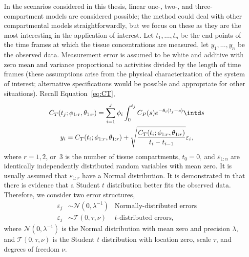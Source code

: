 In the scenarios considered in this thesis, linear one-, two-, and
three-compartment models are considered possible; the method could deal with
other compartmental models straightforwardly, but we focus on these as they
are the most interesting in the application of interest. Let $t_1, \dots, t_n$
be the end points of the time frames at which the tissue concentrations are
measured, let $y_1,\dots,y_n$ be the observed data. Measurement error is
assumed to be white and additive with zero mean and variance proportional to
activities divided by the length of time frames (these assumptions arise from
the physical characterization of the \pet system of interest; alternative
specifications would be possible and appropriate for other situations).
Recall Equation~\eqref{eq:CT},
\begin{gather*}
  C_T(t_j;\phi_{1:r},\theta_{1:r}) =
  \sum_{i=1}^j \phi_i\int_0^{t_j}C_P(s)e^{-\theta_i(t_j-s)} \intd s \\
  y_i = C_T(t_i;\phi_{1:r},\theta_{1:r}) +
  \sqrt{\frac{C_T(t_i;\phi_{1:r},\theta_{1:r})} {t_i - t_{i-1}}}
  \varepsilon_i,
\end{gather*}
where $r = 1, 2$, or~$3$ is the number of tissue compartments, $t_0 = 0$, and
$\varepsilon_{1:n}$ are identically independently distributed random variables
with mean zero. It is usually assumed that $\varepsilon_{1:r}$ have a Normal
distribution. It is demonstrated in \cite{Zhou2013} that there is evidence
that a Student $t$ distribution better fits the observed data. Therefore, we
consider two error structures,
\begin{align*}
  \varepsilon_j &\sim \mathcal{N}(0,\lambda^{-1})
  &\text{Normally-distributed errors} \\
  \varepsilon_j &\sim \mathcal{T}(0,\tau,\nu)
  &\text{$t$-distributed errors},
\end{align*}
where $\mathcal{N}(0,\lambda^{-1})$ is the Normal distribution with mean zero
and precision $\lambda$, and $\mathcal{T}(0,\tau,\nu)$ is the Student $t$
distribution with location zero, scale $\tau$, and degrees of freedom $\nu$.

